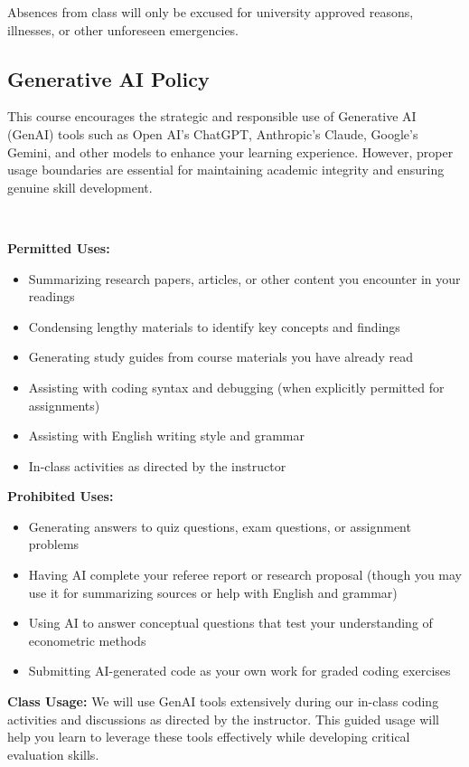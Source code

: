 \documentclass[11pt,english]{article}
\begin{document}
Absences from class will only be excused for university approved reasons, illnesses, or other unforeseen emergencies.

\subsection*{Generative AI Policy}

This course encourages the strategic and responsible use of Generative AI (GenAI) tools such as Open AI's ChatGPT, Anthropic's Claude, Google's Gemini, and other models to enhance your learning experience. However, proper usage boundaries are essential for maintaining academic integrity and ensuring genuine skill development. \par\,\par

\textbf{Permitted Uses:}
\begin{itemize}
    \item Summarizing research papers, articles, or other content you encounter in your readings
    \item Condensing lengthy materials to identify key concepts and findings
    \item Generating study guides from course materials you have already read
    \item Assisting with coding syntax and debugging (when explicitly permitted for assignments)
    \item Assisting with English writing style and grammar
    \item In-class activities as directed by the instructor
\end{itemize}

\textbf{Prohibited Uses:}
\begin{itemize}
    \item Generating answers to quiz questions, exam questions, or assignment problems
    \item Having AI complete your referee report or research proposal (though you may use it for summarizing sources or help with English and grammar)
    \item Using AI to answer conceptual questions that test your understanding of econometric methods
    \item Submitting AI-generated code as your own work for graded coding exercises
\end{itemize}

\textbf{Class Usage:} We will use GenAI tools extensively during our in-class coding activities and discussions as directed by the instructor. This guided usage will help you learn to leverage these tools effectively while developing critical evaluation skills.\par\,\par
\end{document}
